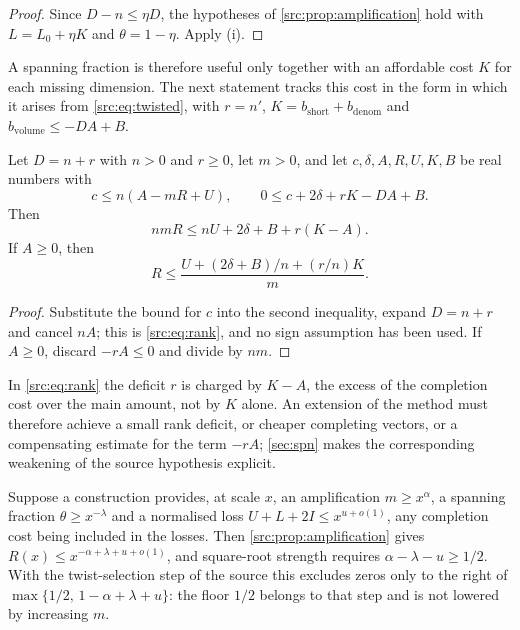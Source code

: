 \begin{proof}
Since $D-n\le\eta D$, the hypotheses of \cref{src:prop:amplification} hold with
$L=L_0+\eta K$ and $\theta=1-\eta$. Apply (i).
\end{proof}

A spanning fraction is therefore useful only together with an affordable cost $K$ for each
missing dimension. The next statement tracks this cost in the form in which it arises from
\eqref{src:eq:twisted}, with $r=n'$, $K=b_{\mathrm{short}}+b_{\mathrm{denom}}$ and
$b_{\mathrm{volume}}\le-DA+B$.

\begin{proposition}\label{src:prop:rank}
Let $D=n+r$ with $n>0$ and $r\ge0$, let $m>0$, and let $c,\delta,A,R,U,K,B$ be real numbers
with
\[
c\le n(A-mR+U),\qquad 0\le c+2\delta+rK-DA+B .
\]
Then
\begin{equation}\label{src:eq:rank}
nmR\le nU+2\delta+B+r(K-A) .
\end{equation}
If $A\ge0$, then
\[
R\le\frac{U+(2\delta+B)/n+(r/n)K}{m} .
\]
\end{proposition}

\begin{proof}
Substitute the bound for $c$ into the second inequality, expand $D=n+r$ and cancel $nA$; this
is \eqref{src:eq:rank}, and no sign assumption has been used. If $A\ge0$, discard $-rA\le0$ and
divide by $nm$.
\end{proof}

In \eqref{src:eq:rank} the deficit $r$ is charged by $K-A$, the excess of the completion cost
over the main amount, not by $K$ alone. An extension of the method must therefore achieve a
small rank deficit, or cheaper completing vectors, or a compensating estimate for the term
$-rA$; \cref{sec:spn} makes the corresponding weakening of the source hypothesis explicit.

\begin{remark}[Rates]\label{src:rem:rates}
Suppose a construction provides, at scale $x$, an amplification $m\ge x^{\alpha}$, a spanning
fraction $\theta\ge x^{-\lambda}$ and a normalised loss $U+L+2I\le x^{u+o(1)}$, any completion
cost being included in the losses. Then \cref{src:prop:amplification} gives
$R(x)\le x^{-\alpha+\lambda+u+o(1)}$, and square-root strength requires
$\alpha-\lambda-u\ge1/2$. With the twist-selection step of the source this excludes zeros
only to the right of $\max\{1/2,\,1-\alpha+\lambda+u\}$: the floor $1/2$ belongs to that step
and is not lowered by increasing $m$.
\end{remark}

